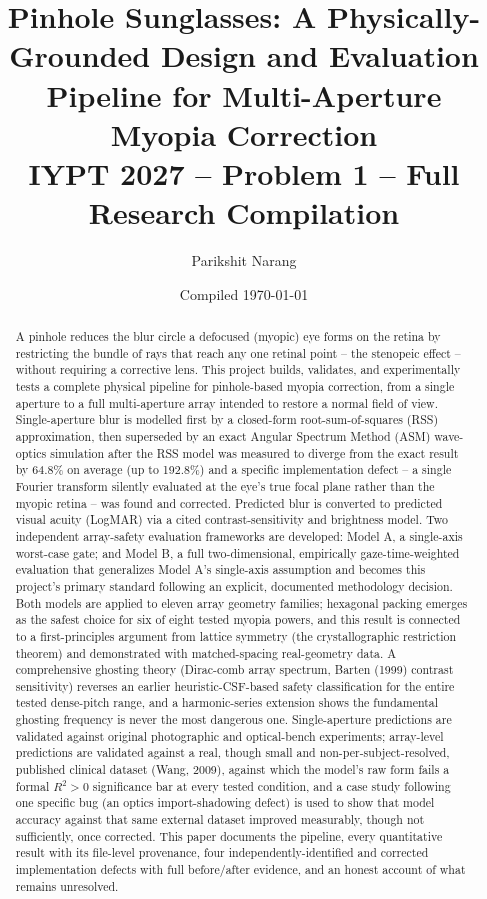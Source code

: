 \documentclass[11pt]{report}
\title{\textbf{Pinhole Sunglasses: A Physically-Grounded Design and Evaluation\\
Pipeline for Multi-Aperture Myopia Correction}\\[0.3cm]
\large IYPT 2027 -- Problem 1 -- Full Research Compilation}
\author{Parikshit Narang}
\date{Compiled \today}
\begin{document}
\maketitle

\begin{abstract}
\noindent
A pinhole reduces the blur circle a defocused (myopic) eye forms on the retina by
restricting the bundle of rays that reach any one retinal point -- the stenopeic
effect -- without requiring a corrective lens. This project builds, validates, and
experimentally tests a complete physical pipeline for pinhole-based myopia correction,
from a single aperture to a full multi-aperture array intended to restore a normal
field of view. Single-aperture blur is modelled first by a closed-form
root-sum-of-squares (RSS) approximation, then superseded by an exact Angular Spectrum
Method (ASM) wave-optics simulation after the RSS model was measured to diverge from
the exact result by 64.8\% on average (up to 192.8\%) and a specific implementation
defect -- a single Fourier transform silently evaluated at the eye's true focal plane
rather than the myopic retina -- was found and corrected. Predicted blur is converted
to predicted visual acuity (LogMAR) via a cited contrast-sensitivity and brightness
model. Two independent array-safety evaluation frameworks are developed: Model A, a
single-axis worst-case gate; and Model B, a full two-dimensional, empirically
gaze-time-weighted evaluation that generalizes Model A's single-axis assumption and
becomes this project's primary standard following an explicit, documented methodology
decision. Both models are applied to eleven array geometry families; hexagonal packing
emerges as the safest choice for six of eight tested myopia powers, and this result is
connected to a first-principles argument from lattice symmetry (the crystallographic
restriction theorem) and demonstrated with matched-spacing real-geometry data. A
comprehensive ghosting theory (Dirac-comb array spectrum, Barten (1999) contrast
sensitivity) reverses an earlier heuristic-CSF-based safety classification for the
entire tested dense-pitch range, and a harmonic-series extension shows the fundamental
ghosting frequency is never the most dangerous one. Single-aperture predictions are
validated against original photographic and optical-bench experiments; array-level
predictions are validated against a real, though small and non-per-subject-resolved,
published clinical dataset (Wang, 2009), against which the model's raw form fails a
formal $R^2>0$ significance bar at every tested condition, and a case study following
one specific bug (an optics import-shadowing defect) is used to show that model
accuracy against that same external dataset improved measurably, though not
sufficiently, once corrected. This paper documents the pipeline, every quantitative
result with its file-level provenance, four independently-identified and corrected
implementation defects with full before/after evidence, and an honest account of what
remains unresolved.
\end{abstract}
\end{document}
